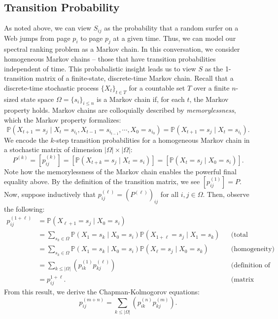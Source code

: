 \documentclass[12pt]{article}
\newcommand{\iterate}[2]{#1^{(#2)}}
\newcommand{\parens}[1]{ \left( #1 \right) }
\newcommand{\prob}{\mathbb{P}}
\begin{document}
\subsection{Transition Probability}
As noted above, we can view $S_{ij}$ as the probability that a random surfer on
a Web jumps from page $p_i$ to page $p_j$ at a given time. Thus, we can model
our spectral ranking problem as a Markov chain. In this conversation, we
consider homogeneous Markov chains -- those that have transition probabilities
independent of time. This probabalistic insight leads us to view $S$ as the
1-transition matrix of a finite-state, discrete-time Markov chain. Recall that a
discrete-time stochastic process $\{X_t\}_{t \in T}$ for a countable set $T$
over a finite $n$-sized state space $\Omega = \{s_i\}_{i\leq n}$ is a Markov chain if, for
each $t$, the Markov property holds. Markov chains are colloquially described by
\textit{memorylessness}, which the Markov property formalizes:
\begin{equation*}
  \prob(X_{t+1} = s_j \mid X_t = s_{i_t}, X_{t-1} = s_{i_{t-1}},\cdots, X_0 =
s_{i_0}) = \prob(X_{t+1} = s_j \mid X_t=s_{i_{t}}).
\end{equation*}
We encode the $k$-step transition probabilities for a homogeneous Markov chain
in a stochastic matrix of dimension $|\Omega| \times |\Omega|$:
\begin{equation}
  \iterate{P}{k} = [ \iterate{p}{k}_{ij} ] = [ \prob(X_{t+k} = s_j \mid X_t =
s_i) ] = [ \prob(X_{t} = s_j \mid X_0 = s_i) ].
\end{equation}
Note how the memorylessness of the Markov chain enables the powerful final
equality above. By the definition of the transition matrix, we see
$ [ \iterate{p}{1}_{ij} ] = P$. Now, suppose inductively that
$\iterate{p}{\ell}_{ij} = \parens{\iterate{P}{\ell}}_{ij}$ for all
$i, j \in \Omega$. Then, observe the following:
\begin{align*}
  \iterate{p}{1+\ell}_{ij} &= \prob(X_{\ell+1} = s_j \mid X_0 = s_i) \\
                           &= \sum_{s_k\in\Omega}{\prob(X_1 = s_k \mid X_0 = s_i) \prob(X_{1+\ell} = s_j \mid
                             X_1 = s_k)} && \text{(total probability)} \\
                           &= \sum_{s_k\in\Omega}{\prob(X_1 = s_k \mid X_0 = s_i) \prob(X_{\ell} = s_j \mid X_0 = s_k)} &&
                                                                                                                           \text{(homogeneity)} \\
                           &= \sum_{k\leq
                             |\Omega|}{\parens{\iterate{p}{1}_{ik}\iterate{p}{\ell}_{kj}}}
                           && \text{(definition of transition matrix)}\\
                           &= p^{1+\ell}_{ij}. && \text{(matrix multiplication)}
\end{align*}
From this result, we derive the Chapman-Kolmogorov equations:
\begin{equation}
  \iterate{p}{m+n}_{ij} = \sum_{k\leq |\Omega|}{\parens{\iterate{p}{n}_{ik} \iterate{p}{m}_{kj}}}.
\end{equation}
\end{document}
